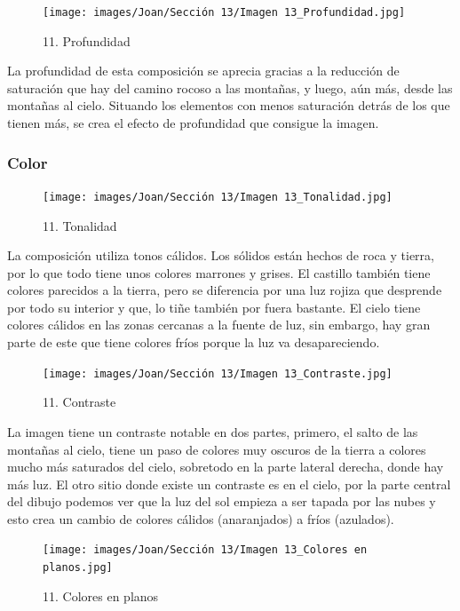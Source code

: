 \documentclass[12pt]{article}
\begin{document}
    \begin{figure}[H]
          \centering
          \texttt{[image: images/Joan/Sección 13/Imagen 13\_Profundidad.jpg]}
          \caption{\small 11. Profundidad}
        \end{figure}

        La profundidad de esta composición se aprecia gracias a la reducción de saturación que hay del camino rocoso a las montañas, y luego, aún más, desde las montañas al cielo. 
    Situando los elementos con menos saturación detrás de los que tienen más, se crea el efecto de profundidad que consigue la imagen. 

            \subsubsection{Color}
    \begin{figure}[H]
          \centering
          \texttt{[image: images/Joan/Sección 13/Imagen 13\_Tonalidad.jpg]}
          \caption{\small 11. Tonalidad}
        \end{figure}

            La composición utiliza tonos cálidos. Los sólidos están hechos de roca y tierra, por lo que todo tiene unos colores marrones y grises. El castillo también tiene colores parecidos a la tierra, pero se diferencia por una luz rojiza que desprende por todo su interior y que, lo tiñe también por fuera bastante. 
    El cielo tiene colores cálidos en las zonas cercanas a la fuente de luz, sin embargo, hay gran parte de este que tiene colores fríos porque la luz va desapareciendo. 

            \begin{figure}[H]
          \centering
          \texttt{[image: images/Joan/Sección 13/Imagen 13\_Contraste.jpg]}
          \caption{\small 11. Contraste}
        \end{figure}
        La imagen tiene un contraste notable en dos partes, primero, el salto de las montañas al cielo, tiene un paso de colores muy oscuros de la tierra a colores mucho más saturados del cielo, sobretodo en la parte lateral derecha, donde hay más luz. 
    El otro sitio donde existe un contraste es en el cielo, por la parte central del dibujo podemos ver que la luz del sol empieza a ser tapada por las nubes y esto crea un cambio de colores cálidos (anaranjados) a fríos (azulados). 

        \begin{figure}[H]
          \centering
          \texttt{[image: images/Joan/Sección 13/Imagen 13\_Colores en planos.jpg]}
          \caption{\small 11. Colores en planos}
        \end{figure}
\end{document}
